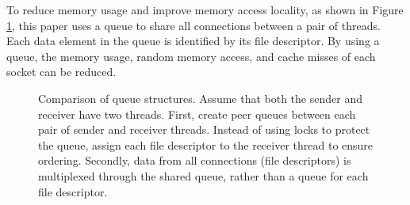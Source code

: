 To reduce memory usage and improve memory access locality, as shown in Figure \ref{socksdirect:fig:fork-rdwr}, this paper uses a queue to share all connections between a pair of threads. Each data element in the queue is identified by its file descriptor. By using a queue, the memory usage, random memory access, and cache misses of each socket can be reduced.

\begin{figure}[htbp]
	\centering

	\caption{Comparison of queue structures. Assume that both the sender and receiver have two threads. First, create peer queues between each pair of sender and receiver threads. Instead of using locks to protect the queue, assign each file descriptor to the receiver thread to ensure ordering. Secondly, data from all connections (file descriptors) is multiplexed through the shared queue, rather than a queue for each file descriptor.}
	\label{socksdirect:fig:fork-rdwr}
\end{figure}

